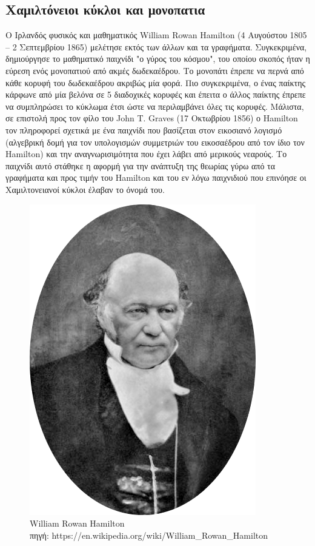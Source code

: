 \documentclass[oneside,12pt]{book}
\newenvironment{matlab}
	{\begin{figure}[hp]\centering\captionsetup{justification=centering}}
	{\end{figure}}
\theoremstyle{definition}
\begin{document}
\subsection{Χαμιλτόνειοι κύκλοι και μονοπατια}

O Ιρλανδός φυσικός και μαθηματικός William Rowan Hamilton (4 Αυγούστου 1805 – 2 Σεπτεμβρίου 1865) μελέτησε εκτός των άλλων και τα γραφήματα. Συγκεκριμένα, δημιούργησε το μαθηματικό παιχνίδι "ο γύρος του κόσμου", του οποίου σκοπός ήταν η εύρεση ενός μονοπατιού από ακμές δωδεκαέδρου. Το μονοπάτι έπρεπε να περνά από κάθε κορυφή του δωδεκαέδρου ακριβώς μία φορά. Πιο συγκεκριμένα, ο ένας παίκτης κάρφωνε από μία βελόνα σε 5 διαδοχικές κορυφές και έπειτα ο άλλος παίκτης έπρεπε να συμπληρώσει το κύκλωμα έτσι ώστε να περιλαμβάνει όλες τις κορυφές. Μάλιστα, σε επιστολή προς τον φίλο του John T. Graves (17 Οκτωβρίου 1856) ο Hamilton τον πληροφορεί σχετικά με ένα παιχνίδι που βασίζεται στον εικοσιανό λογισμό (αλγεβρική δομή για τον υπολογισμών συμμετριών του εικοσαέδρου από τον ίδιο τον Hamilton) και την αναγνωρισιμότητα που έχει λάβει από μερικούς νεαρούς. Το παιχνίδι αυτό στάθηκε η αφορμή για την ανάπτυξη της θεωρίας γύρω από τα γραφήματα και προς τιμήν του Hamilton και του εν λόγω παιχνιδιού που επινόησε οι Χαμιλτονειανοί κύκλοι έλαβαν το όνομά του. \\

\begin{matlab}
	\includegraphics[scale=0.2]{images/Hamilton.png}
	\caption{William Rowan Hamilton \\ πηγή: https://en.wikipedia.org/wiki/William\_Rowan\_Hamilton}
\end{matlab}  
\end{document}
